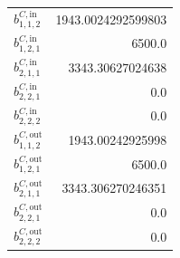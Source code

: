 \documentclass{article}%
\begin{document}
\begin{multicols*}{3}
\begin{supertabular}{lr}
	$b_{1,1,2}^{C,\text{in}}$ & 1943.0024292599803 \\%
	$b_{1,2,1}^{C,\text{in}}$ & 6500.0 \\%
	$b_{2,1,1}^{C,\text{in}}$ & 3343.30627024638 \\%
	$b_{2,2,1}^{C,\text{in}}$ & 0.0 \\%
	$b_{2,2,2}^{C,\text{in}}$ & 0.0 \\%
	$b_{1,1,2}^{C,\text{out}}$ & 1943.00242925998 \\%
	$b_{1,2,1}^{C,\text{out}}$ & 6500.0 \\%
	$b_{2,1,1}^{C,\text{out}}$ & 3343.306270246351 \\%
	$b_{2,2,1}^{C,\text{out}}$ & 0.0 \\%
	$b_{2,2,2}^{C,\text{out}}$ & 0.0 \\%
\end{supertabular}%
\end{multicols*}%
\end{document}
